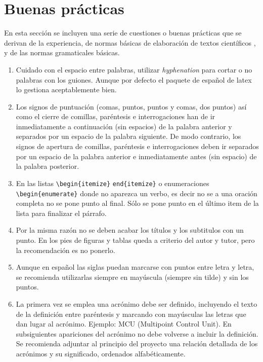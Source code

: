 \chapter {Buenas prácticas}


En esta sección se incluyen una serie de cuestiones o buenas prácticas que se derivan de la experiencia, de normas básicas de elaboración de textos científicos \cite{ejemploarticulo}, y de las normas gramaticales básicas.

\begin{enumerate}
    \item Cuidado con el espacio entre palabras, utilizar \emph{hyphenation} para cortar o no palabras con los guiones. Aunque por defecto el paquete de español de latex lo gestiona aceptablemente bien.

\item Los signos de puntuación (comas, puntos, puntos y comas, dos puntos) así   como   el   cierre  de   comillas, paréntesis e   interrogaciones han   de   ir inmediatamente   a   continuación   (sin   espacios)   de   la   palabra   anterior   y separados  por  un  espacio  de  la  palabra siguiente.  De  modo  contrario,  los signos   de   apertura   de   comillas, paréntesis e   interrogaciones deben   ir separados  por  un  espacio  de  la  palabra  anterior e inmediatamente  antes  (sin espacio) de la palabra posterior.


\item En las listas \lstinline[language=enparrafo]!\begin{itemize}! \lstinline[language=enparrafo]!end{itemize}! o enumeraciones \lstinline[language=enparrafo]!\begin{enumerate}! donde no aparezca un verbo, es decir no se a una oración completa no se pone punto al final. Sólo se pone punto en el último item de la lista para finalizar el párrafo.

\item Por la misma razón no se deben acabar los títulos y los subtitulos con un punto. En los pies de figuras y tablas queda a criterio del autor y tutor, pero la recomendación es no ponerlo.

\item Aunque en español las siglas puedan marcarse con puntos entre letra y letra,  se  recomienda  utilizarlas  siempre  en  mayúscula  (siempre  sin  tilde) y  sin los    puntos.

\item La  primera  vez  se emplea una acrónimo debe  ser  definido, incluyendo   el   texto   de   la   definición   entre   paréntesis   y   marcando   con mayúsculas  las  letras  que  dan  lugar  al  acrónimo.  Ejemplo:  MCU  (Multipoint Control  Unit).  En  subsiguientes  apariciones  del  acrónimo  no  debe  volverse  a incluir  la  definición.  Se  recomienda  adjuntar  al  principio  del  proyecto  una relación    detallada    de    los    acrónimos    y    su    significado,    ordenados alfabéticamente.



\end{enumerate}
